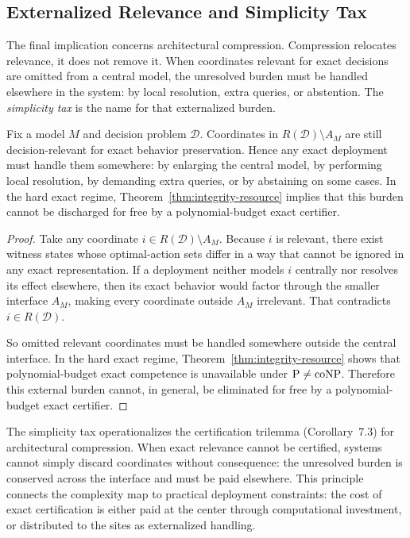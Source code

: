 \subsection{Externalized Relevance and Simplicity Tax}\label{sec:simplicity-tax}

The final implication concerns architectural compression. Compression relocates relevance, it does not remove it. When coordinates relevant for exact decisions are omitted from a central model, the unresolved burden must be handled elsewhere in the system: by local resolution, extra queries, or abstention. The \emph{simplicity tax} is the name for that externalized burden.

\begin{corollary}
Fix a model $M$ and decision problem $\mathcal{D}$. Coordinates in $R(\mathcal{D})\setminus A_M$ are still decision-relevant for exact behavior preservation. Hence any exact deployment must handle them somewhere: by enlarging the central model, by performing local resolution, by demanding extra queries, or by abstaining on some cases. In the hard exact regime, Theorem~\ref{thm:integrity-resource} implies that this burden cannot be discharged for free by a polynomial-budget exact certifier.
\end{corollary}

\begin{proof}
Take any coordinate $i\in R(\mathcal{D})\setminus A_M$. Because $i$ is relevant, there exist witness states whose optimal-action sets differ in a way that cannot be ignored in any exact representation. If a deployment neither models $i$ centrally nor resolves its effect elsewhere, then its exact behavior would factor through the smaller interface $A_M$, making every coordinate outside $A_M$ irrelevant. That contradicts $i\in R(\mathcal{D})$.

So omitted relevant coordinates must be handled somewhere outside the central interface. In the hard exact regime, Theorem~\ref{thm:integrity-resource} shows that polynomial-budget exact competence is unavailable under $\mathrm{P}\neq\mathrm{coNP}$. Therefore this external burden cannot, in general, be eliminated for free by a polynomial-budget exact certifier.
\end{proof}

The simplicity tax operationalizes the certification trilemma (Corollary~7.3) for architectural compression. When exact relevance cannot be certified, systems cannot simply discard coordinates without consequence: the unresolved burden is conserved across the interface and must be paid elsewhere. This principle connects the complexity map to practical deployment constraints: the cost of exact certification is either paid at the center through computational investment, or distributed to the sites as externalized handling.

